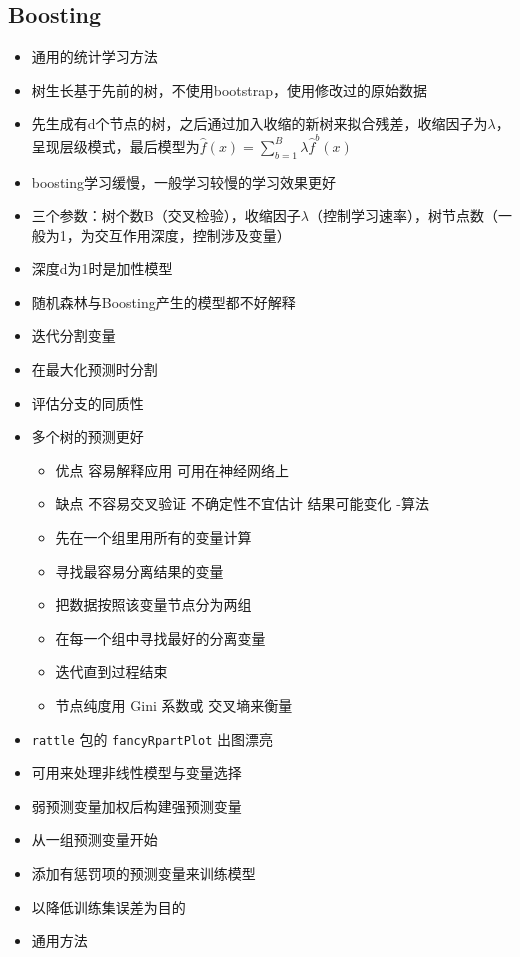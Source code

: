 \documentclass[]{book}
\providecommand{\tightlist}{%
  \setlength{\itemsep}{0pt}\setlength{\parskip}{0pt}}
\begin{document}
\hypertarget{boosting}{%
\subsection{Boosting}\label{boosting}}

\begin{itemize}
\item
  通用的统计学习方法
\item
  树生长基于先前的树，不使用bootstrap，使用修改过的原始数据
\item
  先生成有d个节点的树，之后通过加入收缩的新树来拟合残差，收缩因子为\(\lambda\)，呈现层级模式，最后模型为\(\hat f(x) = \sum_{b = 1}^B \lambda \hat f^b(x)\)
\item
  boosting学习缓慢，一般学习较慢的学习效果更好
\item
  三个参数：树个数B（交叉检验），收缩因子\(\lambda\)（控制学习速率），树节点数（一般为1，为交互作用深度，控制涉及变量）
\item
  深度d为1时是加性模型
\item
  随机森林与Boosting产生的模型都不好解释
\item
  迭代分割变量
\item
  在最大化预测时分割
\item
  评估分支的同质性
\item
  多个树的预测更好

  \begin{itemize}
  \tightlist
  \item
    优点 容易解释应用 可用在神经网络上
  \item
    缺点 不容易交叉验证 不确定性不宜估计 结果可能变化
    -算法
  \item
    先在一个组里用所有的变量计算
  \item
    寻找最容易分离结果的变量
  \item
    把数据按照该变量节点分为两组
  \item
    在每一个组中寻找最好的分离变量
  \item
    迭代直到过程结束\\
  \item
    节点纯度用 Gini 系数或 交叉墒来衡量
  \end{itemize}
\item
  \texttt{rattle} 包的 \texttt{fancyRpartPlot} 出图漂亮
\item
  可用来处理非线性模型与变量选择
\item
  弱预测变量加权后构建强预测变量
\item
  从一组预测变量开始
\item
  添加有惩罚项的预测变量来训练模型
\item
  以降低训练集误差为目的
\item
  通用方法
\end{itemize}
\end{document}
